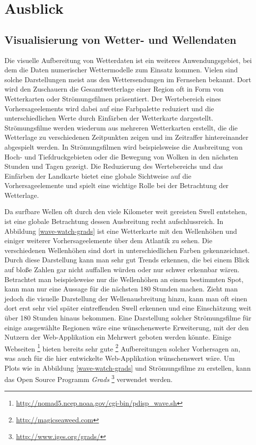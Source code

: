 \chapter{Ausblick}

\section{Visualisierung von Wetter- und Wellendaten}
Die visuelle Aufbereitung von Wetterdaten ist ein weiteres
Anwendungsgebiet, bei dem die Daten numerischer Wettermodelle zum
Einsatz kommen. Vielen sind solche Darstellungen meist aus den
Wettersendungen im Fernsehen bekannt. Dort wird den Zuschauern die
Gesamtwetterlage einer Region oft in Form von Wetterkarten oder
Strömungsfilmen präsentiert. Der Wertebereich eines Vorhersageelements
wird dabei auf eine Farbpalette reduziert und die unterschiedlichen
Werte durch Einfärben der Wetterkarte dargestellt. Strömungsfilme
werden wiederum aus mehreren Wetterkarten erstellt, die die Wetterlage
zu verschiedenen Zeitpunkten zeigen und im Zeitraffer hintereinander
abgespielt werden. In Strömungsfilmen wird beispielsweise die
Ausbreitung von Hoch- und Tiefdruckgebieten oder die Bewegung von
Wolken in den nächsten Stunden und Tagen gezeigt. Die Reduzierung des
Wertebereichs und das Einfärben der Landkarte bietet eine globale
Sichtweise auf die Vorhersageelemente und spielt eine wichtige Rolle
bei der Betrachtung der Wetterlage.

Da surfbare Wellen oft durch den viele Kilometer weit gereisten Swell
entstehen, ist eine globale Betrachtung dessen Ausbreitung recht
aufschlussreich. In Abbildung \ref{wave-watch-grads} ist eine
Wetterkarte mit den Wellenhöhen und einiger weiterer
Vorhersageelemente über dem Atlantik zu sehen. Die verschiedenen
Wellenhöhen sind dort in unterschiedlichen Farben
gekennzeichnet. Durch diese Darstellung kann man sehr gut Trends
erkennen, die bei einem Blick auf bloße Zahlen gar nicht auffallen
würden oder nur schwer erkennbar wären. Betrachtet man beispielsweise
nur die Wellenhöhen an einem bestimmten Spot, kann man nur eine
Aussage für die nächsten 180 Stunden machen. Zieht man jedoch die
visuelle Darstellung der Wellenausbreitung hinzu, kann man oft einen
dort erst sehr viel später eintreffenden Swell erkennen und eine
Einschätzung weit über 180 Stunden hinaus bekommen. Eine Darstellung
solcher Strömungsfilme für einige ausgewählte Regionen wäre eine
wünschenswerte Erweiterung, mit der den Nutzern der Web-Applikation
ein Mehrwert geboten werden könnte. Einige Webseiten
\footnote{\url{http://nomad5.ncep.noaa.gov/cgi-bin/pdisp_wave.sh}}
bieten bereits sehr gute \footnote{\url{http://magicseaweed.com}}
Aufbereitungen solcher Vorhersagen an, was auch für die hier
entwickelte Web-Applikation wünschenswert wäre. Um Plots wie in
Abbildung \ref{wave-watch-grads} und Strömungsfilme zu erstellen, kann
das Open Source Programm \textit{Grads}
\footnote{\url{http://www.iges.org/grads/}} verwendet werden.

